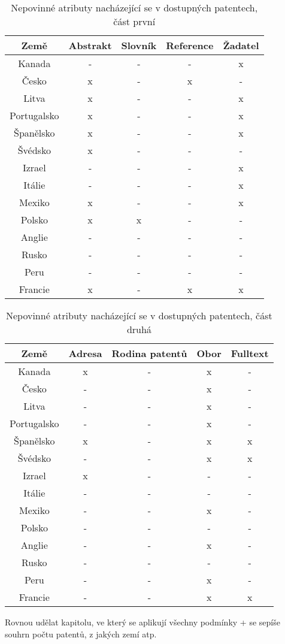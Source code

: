 	\begin{table}[h!]
	\centering
	\begin{tabular}{|c|c|c|c|c|} 
	\hline
	\textbf{Země}    & \textbf{Abstrakt} & \textbf{Slovník} & \textbf{Reference} & \textbf{Žadatel} \\
	\hline
	Kanada & - & - & - & x \\
	\hline
	Česko & x & - & x & - \\
	\hline
	Litva & x & - & - & x \\
	\hline
	Portugalsko & x & - & - & x \\
	\hline
	Španělsko & x & - & - & x \\
	\hline
	Švédsko & x & - & - & - \\
	\hline
	Izrael & - & - & - & x \\
	\hline
	Itálie & - & - & - & x \\
	\hline
	Mexiko & x & - & - & x \\
	\hline
	Polsko & x & x & - & - \\
	\hline
	Anglie & - & - & - & - \\
	\hline
	Rusko & - & - & - & - \\
	\hline
	Peru & - & - & - & - \\
	\hline
	Francie & x & - & x & x \\
	\hline
	\end{tabular}
	\caption{Nepovinné atributy nacházející se v dostupných patentech, část první}
	\label{tab:table_attributes_notcrit1}
	\end{table}

	\begin{table}[h!]
	\centering
	\begin{tabular}{|c|c|c|c|c|} 
	\hline
	\textbf{Země}    &  \textbf{Adresa} & \textbf{Rodina patentů} & \textbf{Obor} & \textbf{Fulltext} \\
	\hline
	Kanada & x & - & x & - \\
	\hline
	Česko & - & - & x & - \\
	\hline
	Litva & - & - & x & - \\
	\hline
	Portugalsko & - & - & x & - \\
	\hline
	Španělsko & x & - & x & x \\
	\hline
	Švédsko & - & - & x & x \\
	\hline
	Izrael & x & - & - & - \\
	\hline
	Itálie & - & - & - & - \\
	\hline
	Mexiko & - & - & x & - \\
	\hline
	Polsko & - & - & - & - \\
	\hline
	Anglie & - & - & x & - \\
	\hline
	Rusko & - & - & - & - \\
	\hline
	Peru & - & - & x & - \\
	\hline
	Francie & - & - & x & x \\
	\hline
	\end{tabular}
	\caption{Nepovinné atributy nacházející se v dostupných patentech, část druhá}
	\label{tab:table_attributes_notcrit2}
	\end{table}

Rovnou udělat kapitolu, ve který se aplikují všechny podmínky + se sepíše souhrn počtu patentů, z jakých zemí atp.
